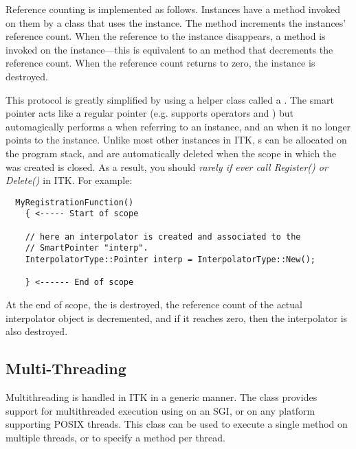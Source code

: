 Reference counting is implemented as follows. Instances have a
 method invoked on them by a class that uses the
instance. The  method increments the instances' reference
count. When the reference to the instance disappears, a 
method is invoked on the instance---this is equivalent to an
 method that decrements the reference count. When the
reference count returns to zero, the instance is destroyed.

This protocol is greatly simplified by using a helper class called a
. The smart pointer acts like a regular pointer 
(e.g. supports operators \code{->} and \code{*}) but automagically
performs a  when referring to an instance, and an
 when it no longer points to the instance.  Unlike
most other instances in ITK, s can be allocated
on the program stack, and are automatically deleted when the scope in
which the  was created is closed. As a result, you should
\emph{rarely if ever call Register() or Delete()} in ITK. For example:

\begin{verbatim}
  MyRegistrationFunction()
    { <----- Start of scope

    // here an interpolator is created and associated to the
    // SmartPointer "interp".
    InterpolatorType::Pointer interp = InterpolatorType::New();

    } <------ End of scope
\end{verbatim}


At the end of scope, the   is destroyed, the
reference count of the actual interpolator object is decremented, and if it
reaches zero, then the interpolator is also destroyed.




\subsection{Multi-Threading}
\label{sec:MultiThreading}

Multithreading is handled in ITK in a generic manner. The class
 provides support for multithreaded execution using
 on an SGI, or  on any platform supporting 
POSIX threads.  This class can be used to execute a single method on multiple
threads, or to specify a method per thread.

